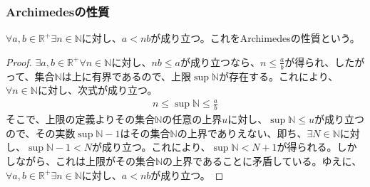 \documentclass[dvipdfmx]{jsarticle}
\begin{document}
\subsubsection{Archimedesの性質}%
\begin{thm}[Archimedesの性質]\label{4.1.1.22}
$\forall a,b \in \mathbb{R}^{+}\exists n \in \mathbb{N}$に対し、$a < nb$が成り立つ。これをArchimedesの性質という。
\end{thm}
\begin{proof}
$\exists a,b \in \mathbb{R}^{+}\forall n \in \mathbb{N}$に対し、$nb \leq a$が成り立つなら、$n \leq \frac{a}{b}$が得られ、したがって、集合$\mathbb{N}$は上に有界であるので、上限$\sup\mathbb{N}$が存在する。これにより、$\forall n \in \mathbb{N}$に対し、次式が成り立つ。
\begin{align*}
n \leq \sup\mathbb{N} \leq \frac{a}{b}
\end{align*}
そこで、上限の定義よりその集合$\mathbb{N}$の任意の上界$u$に対し、$\sup\mathbb{N} \leq u$が成り立つので、その実数$\sup\mathbb{N} - 1$はその集合$\mathbb{N}$の上界でありえない、即ち、$\exists N \in \mathbb{N}$に対し、$\sup\mathbb{N} - 1 < N$が成り立つ。これにより、$\sup\mathbb{N} < N + 1$が得られる。しかしながら、これは上限がその集合$\mathbb{N}$の上界であることに矛盾している。ゆえに、$\forall a,b \in \mathbb{R}^{+}\exists n \in \mathbb{N}$に対し、$a < nb$が成り立つ。
\end{proof}
\end{document}
